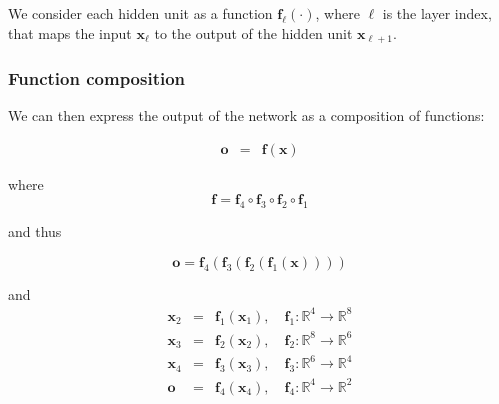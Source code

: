 \documentclass[smaller, handout]{beamer}
\begin{document}
\begin{frame}
\begin{center}
  \end{center}

  \pause
  We consider each hidden unit as a function $\bm f_{\ell}(\cdot)$, where $\ell$ is the layer index, that maps the input $\bm x_{\ell}$ to the output of the hidden unit $\bm x_{\ell+1}$. \pause

\end{frame}


\begin{frame}
  \frametitle{Function composition}

  We can then express the output of the network as a composition of functions:

  \begin{eqnarray}
    \bm o &=& \bm f(\bm x)
  \end{eqnarray}

  \pause
  where 
  \begin{equation}
    \bm f = \bm f_{4} \circ \bm f_{3} \circ \bm f_{2} \circ \bm f_{1}
  \end{equation}

  and thus

  \begin{equation}
    \bm o = \bm f_{4}(\bm f_{3}(\bm f_{2}(\bm f_{1}(\bm x))))
  \end{equation}

  and
  \begin{eqnarray*}
    \bm x_{2} &=& \bm f_{1}(\bm x_1), \quad \bm f_1 : \mathbb{R}^4 \to \mathbb{R}^8 \\
    \bm x_{3} &=& \bm f_{2}(\bm x_{2}), \quad \bm f_2 : \mathbb{R}^8 \to \mathbb{R}^6 \\
    \bm x_4 &=& \bm f_{3}(\bm x_{3}), \quad \bm f_3 : \mathbb{R}^6 \to \mathbb{R}^4 \\
    \bm o &=& \bm f_{4}(\bm x_{4}), \quad \bm f_4 : \mathbb{R}^4 \to \mathbb{R}^2
  \end{eqnarray*}
\end{frame}
\end{document}
